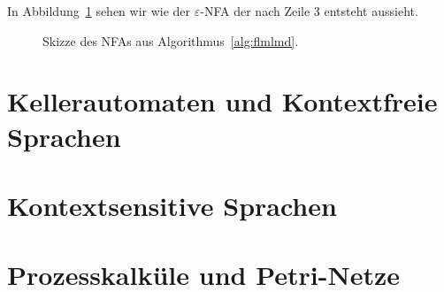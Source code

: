 \documentclass[11pt, a4paper]{article}
\theoremstyle{definition}
\theoremstyle{plain}
\numberwithin{equation}{section}
\begin{document}
In Abbildung~\ref{fig:flmlmd} sehen wir wie der $\varepsilon$-NFA der nach Zeile 3 entsteht aussieht.
\begin{figure}
	\centering
	
	\caption{Skizze des NFAs aus Algorithmus~\ref{alg:flmlmd}.}
	\label{fig:flmlmd}
\end{figure}



\newpage
\section{Kellerautomaten und Kontextfreie Sprachen}\label{sec:contextfree}

\newpage
\section{Kontextsensitive Sprachen}\label{sec:contextsensitive}

\newpage
\section{Prozesskalküle und Petri-Netze}\label{sec:process}

\newpage
{}


\end{document}
